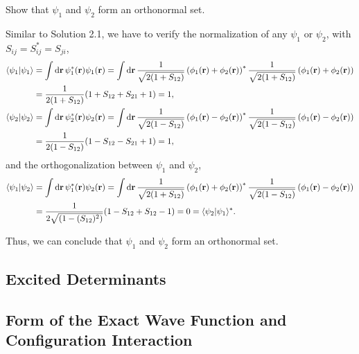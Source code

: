 \documentclass[a4paper]{book}
\newcommand*{\dif}{\mathop{}\!\mathrm{d}}
\newcommand{\bfr}{{\bf r}}
\begin{document}
	\begin{exercise}
	Show that $\psi_1$ and $\psi_2$ form an orthonormal set.
	\end{exercise}
	
	\begin{solution}
	Similar to Solution 2.1, we have to verify the normalization of any $\psi_1$ or $\psi_2$, with $S_{ij} = S^*_{ij} = S_{ji}$,
	\begin{align}
		\langle \psi_1 | \psi_1 \rangle &= \int \dif \bfr \, \psi^*_1( \bfr ) \psi_1( \bfr ) = \int \dif \bfr \,  \frac{1}{ \sqrt{ 2 ( 1 + S_{12} ) } } \left( \phi_1(\bfr) + \phi_2(\bfr) \right)^* \frac{1}{ \sqrt{ 2 ( 1 + S_{12} ) } } \left( \phi_1(\bfr) + \phi_2(\bfr) \right) \notag \\
		&= \frac{1}{ 2 ( 1 + S_{12} ) } ( 1 + S_{12} + S_{21} + 1 ) = 1, \\
		\langle \psi_2 | \psi_2 \rangle &= \int \dif \bfr \, \psi^*_2( \bfr ) \psi_2( \bfr ) = \int \dif \bfr \,  \frac{1}{ \sqrt{ 2 ( 1 - S_{12} ) } } \left( \phi_1(\bfr) - \phi_2(\bfr) \right)^* \frac{1}{ \sqrt{ 2 ( 1 - S_{12} ) } } \left( \phi_1(\bfr) - \phi_2(\bfr) \right) \notag \\
		&= \frac{1}{ 2 ( 1 - S_{12} ) } ( 1 - S_{12} - S_{21} + 1 ) = 1,
	\end{align}
	and the orthogonalization between $\psi_1$ and $\psi_2$,
	\begin{align}
		\langle \psi_1 | \psi_2 \rangle &= \int \dif \bfr \, \psi^*_1( \bfr ) \psi_2( \bfr ) = \int \dif \bfr \,  \frac{1}{ \sqrt{ 2 ( 1 + S_{12} ) } } \left( \phi_1(\bfr) + \phi_2(\bfr) \right)^* \frac{1}{ \sqrt{ 2 ( 1 - S_{12} ) } } \left( \phi_1(\bfr) - \phi_2(\bfr) \right) \notag \\
		&= \frac{1}{ 2 \sqrt{  ( 1 - (S_{12})^2 ) } } ( 1 - S_{12} + S_{12} - 1 ) = 0 = \langle \psi_2 | \psi_1 \rangle^*.
	\end{align}	
	
	Thus, we can conclude that $\psi_1$ and $\psi_2$ form an orthonormal set.
	\end{solution}
	
	\subsection{Excited Determinants}
	
	\subsection{Form of the Exact Wave Function and Configuration Interaction}
	
\end{document}
